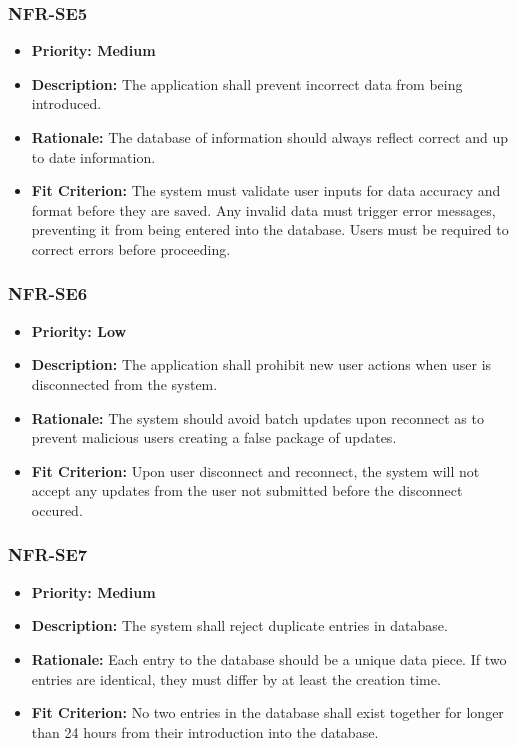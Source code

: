 \documentclass[12pt]{article}
\begin{document}
\subsubsection*{NFR-SE5}
\label{sec:SE5}
\begin{itemize}
  \item \textbf{Priority: Medium}
  \item \textbf{Description:} The application shall prevent incorrect data from being introduced.
  \item \textbf{Rationale:} The database of information should always reflect correct and up to date information.
  \item \textbf{Fit Criterion:} The system must validate user inputs for data accuracy and format before they are saved. Any invalid data must trigger error messages, preventing it from being entered into the database. Users must be required to correct errors before proceeding.
\end{itemize}
\subsubsection*{NFR-SE6}
\label{sec:SE6}
\begin{itemize}
  \item \textbf{Priority: Low}
  \item \textbf{Description:} The application shall prohibit new user actions when user is disconnected from the system.
  \item \textbf{Rationale:} The system should avoid batch updates upon reconnect as to prevent malicious users creating a false package of updates.
  \item \textbf{Fit Criterion:} Upon user disconnect and reconnect, the system will not accept any updates from the user not submitted before the disconnect occured.
\end{itemize}
\subsubsection*{NFR-SE7}
\label{sec:SE7}
\begin{itemize}
  \item \textbf{Priority: Medium}
  \item \textbf{Description:} The system shall reject duplicate entries in database.
  \item \textbf{Rationale:} Each entry to the database should be a unique data piece. If two entries are identical, they must differ by at least the creation time.
  \item \textbf{Fit Criterion:} No two entries in the database shall exist together for longer than 24 hours from their introduction into the database.
\end{itemize}
\end{document}
